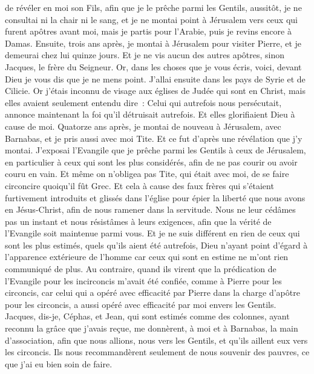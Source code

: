 \begin{multicols}{2}
de révéler en moi son Fils, afin que je le prêche parmi les Gentils, aussitôt, je ne consultai ni la chair ni le sang,
et je ne montai point à Jérusalem vers ceux qui furent apôtres avant moi, mais je partis pour l'Arabie, puis je revins encore à Damas.
Ensuite, trois ans après, je montai à Jérusalem pour visiter Pierre, et je demeurai chez lui quinze jours.
Et je ne vis aucun des autres apôtres, sinon Jacques, le frère du Seigneur.
Or, dans les choses que je vous écris, voici, devant Dieu je vous dis que je ne mens point.
J'allai ensuite dans les pays de Syrie et de Cilicie.
Or j'étais inconnu de visage aux églises de Judée qui sont en Christ,
mais elles avaient seulement entendu dire~: Celui qui autrefois nous persécutait, annonce maintenant la foi qu'il détruisait autrefois.
Et elles glorifiaient Dieu à cause de moi.
\VerseOne{}Quatorze ans après, je montai de nouveau à Jérusalem, avec Barnabas, et je pris aussi avec moi Tite.
Et ce fut d'après une révélation que j'y montai. J'exposai l'Evangile que je prêche parmi les Gentils à ceux de Jérusalem, en particulier à ceux qui sont les plus considérés, afin de ne pas courir ou avoir couru en vain.
Et même on n'obligea pas Tite, qui était avec moi, de se faire circoncire quoiqu'il fût Grec.
Et cela à cause des faux frères qui s'étaient furtivement introduits et glissés dans l'église pour épier la liberté que nous avons en Jésus-Christ, afin de nous ramener dans la servitude.
Nous ne leur cédâmes pas un instant et nous résistâmes à leurs exigences, afin que la vérité de l'Evangile soit maintenue parmi vous.
Et je ne suis différent en rien de ceux qui sont les plus estimés, quels qu'ils aient été autrefois, Dieu n'ayant point d'égard à l'apparence extérieure de l'homme car ceux qui sont en estime ne m'ont rien communiqué de plus.
Au contraire, quand ils virent que la prédication de l'Evangile pour les incirconcis m'avait été confiée, comme à Pierre pour les circoncis,
car celui qui a opéré avec efficacité par Pierre dans la charge d'apôtre pour les circoncis, a aussi opéré avec efficacité par moi envers les Gentils.
Jacques, dis-je, Céphas, et Jean, qui sont estimés comme des colonnes, ayant reconnu la grâce que j'avais reçue, me donnèrent, à moi et à Barnabas, la main d'association, afin que nous allions, nous vers les Gentils, et qu'ils aillent eux vers les circoncis.
Ils nous recommandèrent seulement de nous souvenir des pauvres, ce que j'ai eu bien soin de faire.

\end{multicols}
